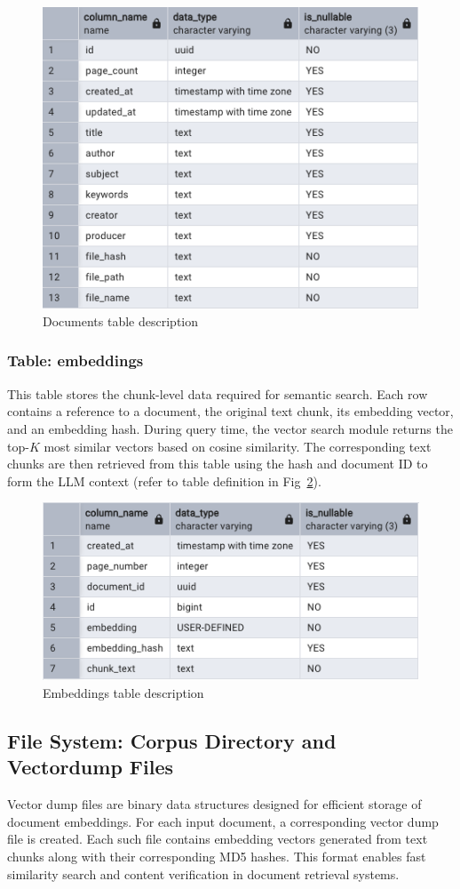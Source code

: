 \begin{figure}[H]
    \centering
    \includegraphics[width=0.7\linewidth]{images/dbtable-documents.png}
    \caption{Documents table description}
    \label{fig:psqlDocumentTableDesc}
\end{figure}


\subsubsection{Table: embeddings}

This table stores the chunk-level data required for semantic search. Each row contains a reference to a document, the original text chunk, its embedding vector, and an embedding hash. During query time, the vector search module returns the top-$K$ most similar vectors based on cosine similarity. The corresponding text chunks are then retrieved from this table using the hash and document ID to form the LLM context (refer to table definition in Fig~\ref{fig:psqlEmbeddingsTable}).

\begin{figure}[H]
    \centering
    \includegraphics[width=0.7\linewidth]{images/dbtable-embeddings.png}
    \caption{Embeddings table description}
    \label{fig:psqlEmbeddingsTable}
\end{figure}
\subsection{File System: Corpus Directory and Vectordump Files}
\label{subsec:AppDesignModules-FSandVectordump_files}
Vector dump files are binary data structures designed for efficient storage of document embeddings. For each input document, a corresponding vector dump file is created. Each such file contains embedding vectors generated from text chunks along with their corresponding MD5 hashes. This format enables fast similarity search and content verification in document retrieval systems.

